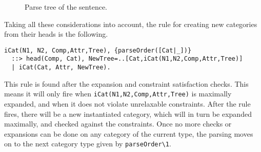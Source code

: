 \documentclass{llncs}
\newcommand{\PN}{\textit{PN}\xspace}
\newcommand{\NP}{\textit{NP}\xspace}
\newcommand{\VP}{\textit{VP}\xspace}
\newcommand{\Se}{\textit{S}\xspace}
\newcommand{\N}{\textit{N}\xspace}
\newcommand{\V}{\textit{V}\xspace}
\newcommand{\D}{\textit{D}\xspace}
\begin{document}
\begin{itemize}
\begin{figure}[H]
\begin{center}
  \caption{Parse tree of the sentence.}
  \label{fig:tree}
  \end{center}
\end{figure}
\end{itemize}

Taking all these considerations into account, the rule for creating new categories from their heads is the following.
\begin{verbatim}
iCat(N1, N2, Comp,Attr,Tree), {parseOrder([Cat|_])}
  ::> head(Comp, Cat), NewTree=..[Cat,iCat(N1,N2,Comp,Attr,Tree)]
  | iCat(Cat, Attr, NewTree).
\end{verbatim}

This rule is found after the expansion and constraint satisfaction checks. This means it will only fire when \texttt{iCat(N1,N2,Comp,Attr,Tree)} is maximally expanded, and when it does not violate unrelaxable constraints. After the rule fires, there will be a new instantiated category, which will in turn be expanded maximally, and checked against the constraints. Once no more checks or expansions can be done on any category of the current type, the parsing moves on to the next category type given by \texttt{parseOrder\textbackslash 1}.
\end{document}
